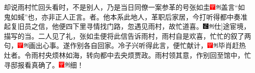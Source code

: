 却说雨村忙回头看时，不是别人，乃是当日同僚一案参革的号张如圭{\includegraphics[width=3mm]{../Images/00002}\includegraphics[width=3mm]{../Images/00011}\footnotesize \kaishu 盖言“如鬼如蜮”也，亦非正人正言。}者。他本系此地人，革职后家居，今打听得都中奏准起复旧员之信，他便四下里寻情找门路，忽遇见雨村，故忙道喜。{\includegraphics[width=3mm]{../Images/00006}\includegraphics[width=3mm]{../Images/00011}\footnotesize \kaishu {(此)}{[}仕{]}途宦境，描写的当。}二人见了礼，张如圭便将此信告诉雨村，雨村自是欢喜，忙忙的叙了两句，{\includegraphics[width=3mm]{../Images/00002}\includegraphics[width=3mm]{../Images/00011}\footnotesize \kaishu 画出心事。}遂作别各自回家。冷子兴听得此言，便忙献计，{\includegraphics[width=3mm]{../Images/00002}\includegraphics[width=3mm]{../Images/00011}\footnotesize \kaishu 毕肖赶热灶者。}令雨村央烦林如海，转向都中去央烦贾政。雨村领其意，作别回至馆中，忙寻邸报看真确了。{\includegraphics[width=3mm]{../Images/00002}\includegraphics[width=3mm]{../Images/00011}\footnotesize \kaishu 细！}

